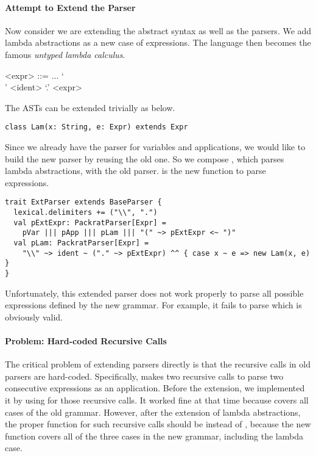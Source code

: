 \paragraph{Attempt to Extend the Parser} Now consider we are extending the abstract syntax as well as the parsers. We add lambda abstractions as a new case of expressions. The language then becomes the famous \textit{untyped lambda calculus}.

\setlength{\grammarindent}{5em}
\begin{grammar}
<expr> ::= ...
    \alt `\\' <ident> `.' <expr>
\end{grammar}

The ASTs can be extended trivially as below.

\begin{lstlisting}
class Lam(x: String, e: Expr) extends Expr
\end{lstlisting}

Since we already have the parser for variables and applications, we would like to build the new parser by reusing the old one. So we compose , which parses lambda abstractions, with the old parser.  is the new function to parse expressions.

\begin{lstlisting}
trait ExtParser extends BaseParser {
  lexical.delimiters += ("\\", ".")
  val pExtExpr: PackratParser[Expr] =
    pVar ||| pApp ||| pLam ||| "(" ~> pExtExpr <~ ")"
  val pLam: PackratParser[Expr] =
    "\\" ~> ident ~ ("." ~> pExtExpr) ^^ { case x ~ e => new Lam(x, e) }
}
\end{lstlisting}

Unfortunately, this extended parser does not work properly to parse all possible expressions defined by the new grammar. For example, it fails to parse   which is obviously valid.

\paragraph{Problem: Hard-coded Recursive Calls} The critical problem of extending parsers directly is that the recursive calls in old parsers are hard-coded. Specifically,  makes two recursive calls to parse two consecutive expressions as an application. Before the extension, we implemented it by using  for those recursive calls. It worked fine at that time because  covers all cases of the old grammar. However, after the extension of lambda abstractions, the proper function for such recursive calls should be  instead of , because the new function  covers all of the three cases in the new grammar, including the lambda case.

